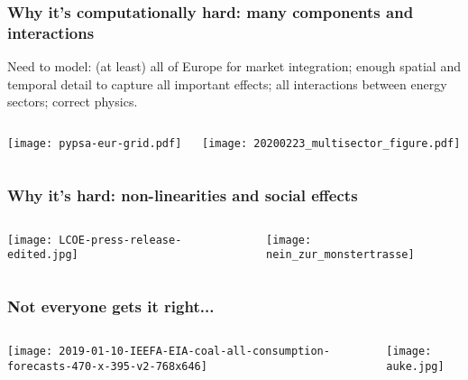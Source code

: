 \documentclass[10pt,aspectratio=169,dvipsnames]{beamer}
\begin{document}
\begin{frame}
  \frametitle{Why it's computationally hard: many components and interactions}

  Need to model: (at least) all of Europe for market integration; enough spatial and temporal detail to capture all important effects;
  all interactions between energy sectors; correct physics.

  \vspace{.3cm}

\begin{columns}[T]
  \begin{column}{6cm}

    \vspace{.2cm}
    \centering
    \texttt{[image: pypsa-eur-grid.pdf]}
  \end{column}

    \begin{column}{5.5cm}

  \centering
  \texttt{[image: 20200223\_multisector\_figure.pdf]}
  \end{column}
\end{columns}

\end{frame}


\begin{frame}
  \frametitle{Why it's hard: non-linearities and social effects}

\begin{columns}[T]
  \begin{column}{7.5cm}

    \vspace{.2cm}
    \centering
    \texttt{[image: LCOE-press-release-edited.jpg]}
  \end{column}
  \begin{column}{6cm}

\centering
\texttt{[image: nein\_zur\_monstertrasse]}
  \end{column}
\end{columns}
\end{frame}



\begin{frame}
  \frametitle{Not everyone gets it right...}
\begin{columns}[T]
  \begin{column}{7.5cm}

    \vspace{.2cm}
    \centering
    \texttt{[image: 2019-01-10-IEEFA-EIA-coal-all-consumption-forecasts-470-x-395-v2-768x646]}
  \end{column}
  \begin{column}{7.5cm}

    \vspace{.2cm}
    \centering
    \texttt{[image: auke.jpg]}
  \end{column}
\end{columns}
\end{frame}
\end{document}
